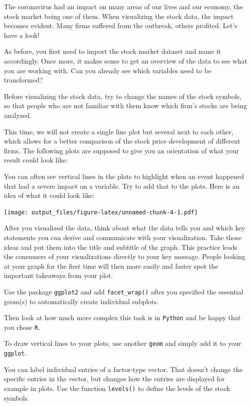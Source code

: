 \documentclass[
  11pt,
]{article}
\newenvironment{tips}[1]
  {
  \begin{itemize}
  \footnotesize
  \renewcommand{\labelitemi}{
    \raisebox{-.7\height}[0pt][0pt]{
      {\setkeys{Gin}{width=3em,keepaspectratio}
        \texttt{[image: images/\#1.png]}}
    }
  }
  \setlength{\fboxsep}{1em}
  \begin{rbox}
  \item
  }
  {
  \end{rbox}
  \end{itemize}
  }
\begin{document}
The coronavirus had an impact on many areas of our lives and our economy, the stock market being one of them. When visualizing the stock data, the impact becomes evident. Many firms suffered from the outbreak, others profited. Let's have a look!

As before, you first need to import the stock market dataset and name it accordingly. Once more, it makes sense to get an overview of the data to see what you are working with. Can you already see which variables need to be transformed?

Before visualizing the stock data, try to change the names of the stock symbols, so that people who are not familiar with them know which firm's stocks are being analyzed.

This time, we will not create a single line plot but several next to each other, which allows for a better comparison of the stock price development of different firms. The following plots are supposed to give you an orientation of what your result could look like:

You can often see vertical lines in the plots to highlight when an event happened that had a severe impact on a variable. Try to add that to the plots. Here is an idea of what it could look like:

\texttt{[image: output\_files/figure-latex/unnamed-chunk-4-1.pdf]}

After you visualized the data, think about what the data tells you and which key statements you can derive and communicate with your visualization. Take those ideas and put them into the title and subtitle of the graph. This practice leads the consumers of your visualizations directly to your key message. People looking at your graph for the first time will then more easily and faster spot the important takeaways from your plot.

\begin{tips}r

Use the package \texttt{ggplot2} and add \texttt{facet\_wrap()} after you specified the essential geom(s) to automatically create individual subplots.

Then look at how much more complex this task is in \texttt{Python} and be happy that you chose \texttt{R}.

To draw vertical lines to your plots, use another \texttt{geom} and simply add it to your \texttt{ggplot}.

You can label individual entries of a factor-type vector. That doesn't change the specific entries in the vector, but changes how the entries are displayed for example in plots. Use the function \texttt{levels()} to define the levels of the stock symbols.

\end{tips}
\end{document}
